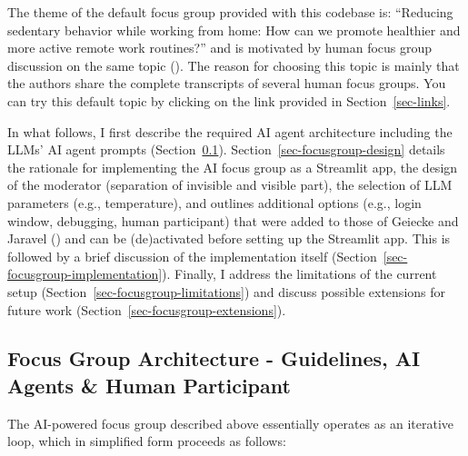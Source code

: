 \documentclass[
  letterpaper,
  DIV=11,
  numbers=noendperiod]{scrartcl}
\begin{document}
The theme of the default focus group provided with this codebase is:
``Reducing sedentary behavior while working from home: How can we
promote healthier and more active remote work routines?'' and is
motivated by human focus group discussion on the same topic
(). The reason for choosing this topic is mainly that the
authors share the complete transcripts of several human focus groups.
You can try this default topic by clicking on the link provided in
Section~\ref{sec-links}.

In what follows, I first describe the required AI agent architecture
including the LLMs' AI agent prompts
(Section~\ref{sec-focusgroup-aiagents}).
Section~\ref{sec-focusgroup-design} details the rationale for
implementing the AI focus group as a Streamlit app, the design of the
moderator (separation of invisible and visible part), the selection of
LLM parameters (e.g., temperature), and outlines additional options
(e.g., login window, debugging, human participant) that were added to
those of Geiecke and Jaravel ()
and can be (de)activated before setting up the Streamlit app. This is
followed by a brief discussion of the implementation itself
(Section~\ref{sec-focusgroup-implementation}). Finally, I address the
limitations of the current setup
(Section~\ref{sec-focusgroup-limitations}) and discuss possible
extensions for future work (Section~\ref{sec-focusgroup-extensions}).

\subsection{Focus Group Architecture - Guidelines, AI Agents \& Human
Participant}\label{sec-focusgroup-aiagents}

The AI-powered focus group described above essentially operates as an
iterative loop, which in simplified form proceeds as follows:
\end{document}
